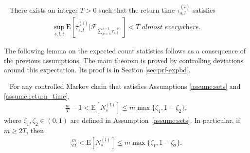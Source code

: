 \documentclass[opre,sglanonrev]{informs4}
\numberwithin{equation}{section}
\newcommand{\pow}[1]{^{(#1)}}
\newcommand{\E}{\mathrm{E}}
\newcommand{\Fcal}{\mathcal{F}}
\begin{document}
{\begin{assumption}~\label{assume:return_time}
There exists an integer $T>0$ such that the return time $\tau^{(i)}_{s,l}$ satisfies
\begin{align*}
    \sup_{s,l,i}\E[\tau^{(i)}_{s,l}|{\Fcal_{\sum_{p=0}^{i-1}\tau_{s,l}\pow{p}}}]<T \textit{ almost everywhere.} 
\end{align*}
\end{assumption}
{ The following lemma on the expected count statistics follows as a consequence of the previous assumptions. The main theorem is proved by controlling deviations around this expectation.} Its proof is in Section \ref{sec:prf-expbd}.
{
\begin{lemma}~\label{lemma:expec-bound}
  For any controlled Markov chain that satisfies Assumptions \ref{assume:sets} and \ref{assume:return_time}, 
  \begin{align}
      \frac{m}{T}-1 < \E\left[ N_s^{(l)} \right] \leq m \max\{ \zeta_1, 1-\zeta_2\},
  \end{align}
  where $\zeta_1, \zeta_2 \in (0,1)$ are defined in Assumption~\ref{assume:sets}.
  In particular, if $m\geq 2T$, then
  \begin{align}
      \frac{m}{2T} < \E\left[ N_s^{(l)} \right] \leq m \max\{ \zeta_1, 1-\zeta_2\}.
  \end{align}


\end{lemma}}}
\end{document}
